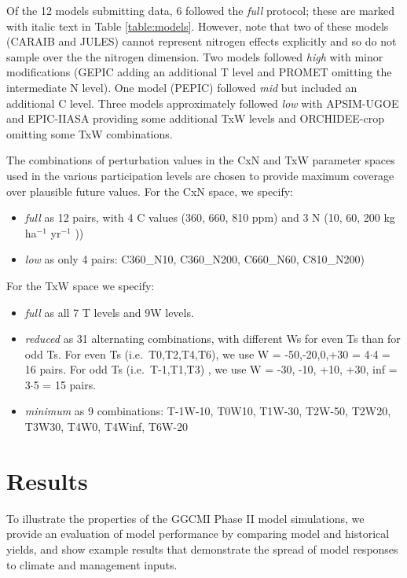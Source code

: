 \documentclass[gmd, manuscript]{copernicus} %
\begin{document}
\noindent Of the 12 models submitting data, 6 followed the \textit{full} protocol; these are marked with italic text in Table \ref{table:models}. 
However, note that two of these models (CARAIB and JULES) cannot represent nitrogen effects explicitly and so do not sample over the the nitrogen dimension. 
Two models followed \textit{high} with minor modifications (GEPIC adding an additional T level and PROMET omitting the intermediate N level). 
One model (PEPIC) followed \textit{mid} but included an additional C level. 
Three models approximately followed \textit{low} with APSIM-UGOE and EPIC-IIASA providing some additional TxW levels and ORCHIDEE-crop omitting some TxW combinations.  

The combinations of perturbation values in the CxN and TxW parameter spaces used in the various participation levels are chosen to provide maximum coverage over plausible future values. For the CxN space, we specify:
\begin{itemize}
  \item \textit{full} as 12 pairs, with 4 C values (360, 660, 810 ppm) and 3 N (10, 60, 200 kg ha$^{-1}$ yr$^{-1}$ ))
  \item \textit{low} as only 4 pairs: C360\_N10, C360\_N200, C660\_N60, C810\_N200) 
\end{itemize}
    
For the TxW space we specify:
\begin{itemize}
  \item \textit{full} as all 7 T levels and 9W levels.
  \item \textit{reduced} as 31 alternating combinations, with different Ws for even Ts than for odd Ts. For even Ts (i.e.\ T0,T2,T4,T6), we use W = -50,-20,0,+30 = 4$\cdot$4 = 16 pairs. For odd Ts (i.e.\ T-1,T1,T3) , we use W = -30, -10, +10, +30, inf = 3$\cdot$5 = 15 pairs.
  \item \textit{minimum} as 9 combinations: T-1W-10, T0W10, T1W-30, T2W-50, T2W20, T3W30, T4W0, T4Winf, T6W-20
\end{itemize}

\section{Results}
\label{S:4}

To illustrate the properties of the GGCMI Phase II model simulations, we provide an evaluation of model performance by comparing model and historical yields, and show example results that demonstrate the spread of model responses to climate and management inputs. 
\end{document}

